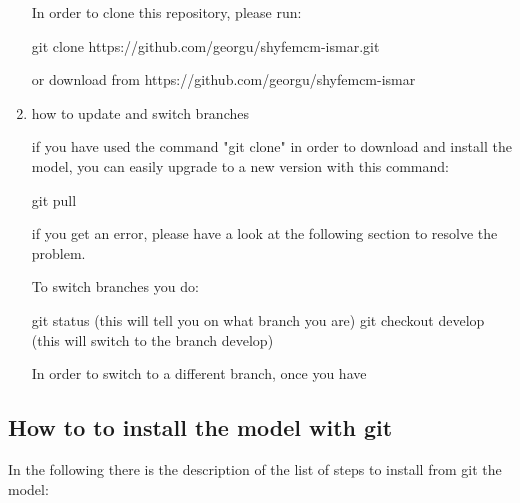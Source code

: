 \begin{enumerate}
	In order to clone this repository, please run:

	git clone https://github.com/georgu/shyfemcm-ismar.git

	or download from https://github.com/georgu/shyfemcm-ismar

\item  how to update and switch branches

	if you have used the command "git clone" in order to download
	and install the model, you can easily upgrade to a new version
	with this command:

	git pull

	if you get an error, please have a look at the following section
	to resolve the problem.

	To switch branches you do:

	git status		 (this will tell you on what branch you are)
	git checkout develop	(this will switch to the branch develop)

	In order to switch to a different branch, once you have 

\end{enumerate}

\subsection{How to to install the model with git}
In the following there is the description of the list of steps to install from git the model:

